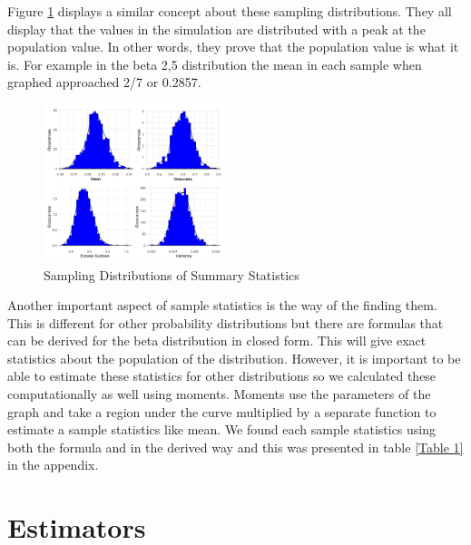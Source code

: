 \documentclass{article}\usepackage[]{graphicx}\usepackage[]{xcolor}
\begin{document}
\begin{multicols}{2}
Figure \ref{Figure 5} displays a similar concept about these sampling distributions. They all display that the values in the simulation are distributed with a peak at the population value. In other words, they prove that the population value is what it is. For example in the beta 2,5 distribution the mean in each sample when graphed approached 2/7 or 0.2857.



\begin{figure}[H]
\centering
\includegraphics[width=0.47\textwidth]{StatDist}  %
\caption{Sampling Distributions of Summary Statistics}
\label{Figure 5}
\end{figure}

Another important aspect of sample statistics is the way of the finding them. This is different for other probability distributions but there are formulas that can be derived for the beta distribution in closed form. This will give exact statistics about the population of the distribution. However, it is important to be able to estimate these statistics for other distributions so we calculated these computationally as well using moments. Moments use the parameters of the graph and take a region under the curve multiplied by a separate function to estimate a sample statistics like mean. We found each sample statistics using both the formula and in the derived way and this was presented in table \ref{Table 1} in the appendix. 

\section{Estimators}


\end{multicols}
\end{document}
